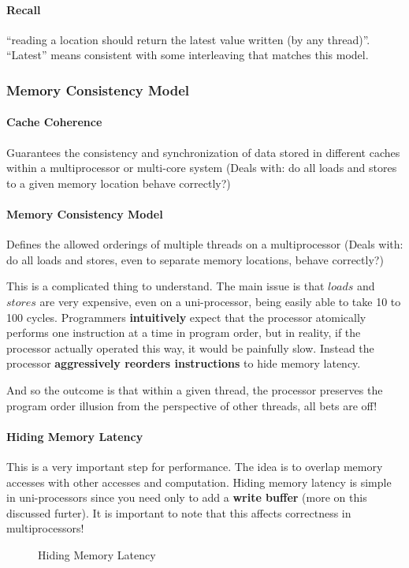 \paragraph{Recall} \enquote{reading a location should return the latest value written (by any thread)}. \enquote{Latest} means consistent with some interleaving that matches this model.
\subsubsection{Memory Consistency Model}
\paragraph{Cache Coherence} Guarantees the consistency and synchronization of data stored in different
caches within a multiprocessor or multi-core system (Deals with: do all loads and stores to a given memory location behave correctly?)
\paragraph{Memory Consistency Model} Defines the allowed orderings of multiple threads on a multiprocessor (Deals with: do all loads and stores, even to separate memory locations, behave correctly?)
%
\clearpage
%
\par This is a complicated thing to understand. The main issue is that $loads$ and $stores$ are very expensive, even on a uni-processor, being easily able to take 10 to 100 cycles. Programmers \textbf{intuitively} expect that the processor atomically performs one instruction at a time in program order, but in reality, if the processor actually operated this way, it would be painfully slow. Instead the processor \textbf{aggressively reorders instructions} to hide memory latency.
\par And so the outcome is that within a given thread, the processor preserves the program order illusion from the perspective of other threads, all bets are off!
\paragraph{Hiding Memory Latency} This is a very important step for performance. The idea is to overlap memory accesses with other accesses and computation. Hiding memory latency is simple in uni-processors since you need only to add a \textbf{write buffer} (more on this discussed furter). It is important to note that this affects correctness in multiprocessors!\\
\begin{figure}[h]
    \begin{minipage}{0.45\textwidth}
        \centering
    \end{minipage}
    \begin{minipage}{0.45\textwidth}
        \centering
    \end{minipage}
    \caption{Hiding Memory Latency}
    \label{fig:enter-label}
\end{figure}
